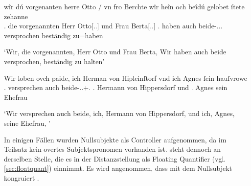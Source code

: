 \begin{exe}
\ex \label{ex:cao_diffgend_11_beide}
	\begin{xlist}
	\ex \label{ex:cao_diffgend_11_beide_1}
		\gll wîr dú vorgenanten herre Otto / vn fro Berchte
				\textelp{} wîr heîn och beîdú \textelp{}
				gelobet ſtete zehanne \\
			\Fpl\subMF.\Nom{} die vorgenannten Herr Otto[\Nom.\Sg.\MascM] {}
				und Frau Berta[\Nom.\Sg.\FemF] {} \Fpl\subMF.\Nom{} haben
				auch beide-\Nom.\Pl.\NeutMF.\St{} {} versprochen beständig
				zu=haben \\
		\begin{taggedline}{\parencites(Basel, 1298)[\pno~2931, 223.1--6]{cao4}}
		\trans `Wir, die vorgenannten, Herr Otto und Frau Berta,
		\textelp{} Wir haben auch beide \textelp{} versprochen, beständig zu
			halten'
		\end{taggedline}

	\ex \label{ex:cao_diffgend_11_beide_2}
		\gll Wir loben ovch paide, ich Herman von
			Hipleinſtorf vnd ich Agnes ſein hauſvrowe \textelp{} \\
			\Fpl\subMF.\Nom{} versprechen auch beide-\Nom.\Pl.\M+\F\subMF.\St{}
			\Fsg\subM.\Nom{} Hermann von Hippersdorf und \Fsg\subF.\Nom{}
			Agnes sein Ehefrau {} \\
		\begin{taggedline}{\parencites(Wien, 1295)[\pno~N~701, 506.32--33]{cao5}}
		\trans `Wir versprechen auch beide, ich, Hermann von
			Hippersdorf, und ich, Agnes, seine Ehefrau, \textelp{}'
		\end{taggedline}
	\end{xlist}
\end{exe}

\label{phsec:vbctrl}
In einigen Fällen wurden Nullsubjekte als Controller aufgenommen, da im
Teilsatz kein overtes Subjektspronomen vorhanden ist.  steht
dennoch an derselben Stelle, die es in der Distanzstellung als Floating
Quantifier (vgl. \cref{sec:floatquant}) einnimmt. Es wird angenommen, dass
 mit dem Nullsubjekt kongruiert
\autocites[siehe auch][419]{dalrymple2001}[210]{bresnanetal2016}.

